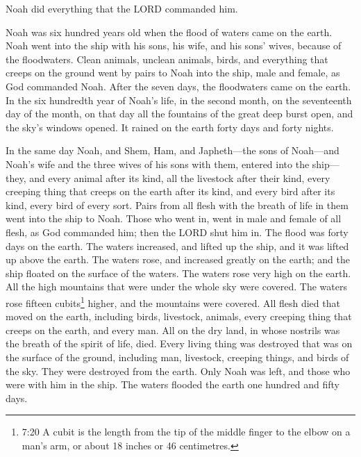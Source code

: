  Noah did everything that the LORD commanded him.

 Noah was six hundred years old when the flood of waters
came on the earth.  Noah went into the ship with his sons,
his wife, and his sons' wives, because of the floodwaters. 
Clean animals, unclean animals, birds, and everything that creeps on the
ground  went by pairs to Noah into the ship, male and
female, as God commanded Noah.  After the seven days, the
floodwaters came on the earth.  In the six hundredth year
of Noah's life, in the second month, on the seventeenth day of the
month, on that day all the fountains of the great deep burst open, and
the sky's windows opened.  It rained on the earth forty
days and forty nights.

 In the same day Noah, and Shem, Ham, and Japheth---the
sons of Noah---and Noah's wife and the three wives of his sons with
them, entered into the ship---  they, and every animal
after its kind, all the livestock after their kind, every creeping thing
that creeps on the earth after its kind, and every bird after its kind,
every bird of every sort.  Pairs from all flesh with the
breath of life in them went into the ship to Noah.  Those
who went in, went in male and female of all flesh, as God commanded him;
then the LORD shut him in.  The flood was forty days on the
earth. The waters increased, and lifted up the ship, and it was lifted
up above the earth.  The waters rose, and increased greatly
on the earth; and the ship floated on the surface of the waters.
 The waters rose very high on the earth. All the high
mountains that were under the whole sky were covered.  The
waters rose fifteen cubits\footnote{7:20 A cubit is the length from the
  tip of the middle finger to the elbow on a man's arm, or about 18
  inches or 46 centimetres.} higher, and the mountains were covered.
 All flesh died that moved on the earth, including birds,
livestock, animals, every creeping thing that creeps on the earth, and
every man.  All on the dry land, in whose nostrils was the
breath of the spirit of life, died.  Every living thing was
destroyed that was on the surface of the ground, including man,
livestock, creeping things, and birds of the sky. They were destroyed
from the earth. Only Noah was left, and those who were with him in the
ship.  The waters flooded the earth one hundred and fifty
days.

